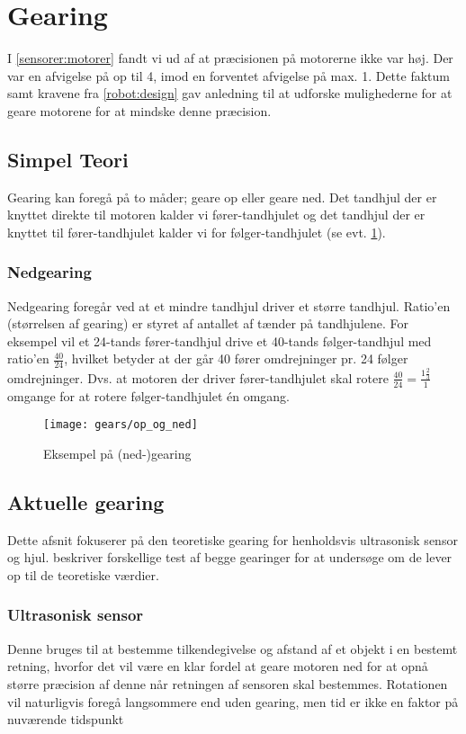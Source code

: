 \section{Gearing}\label{robot:gearing}
I \cref{sensorer:motorer} fandt vi ud af at præcisionen på motorerne ikke var høj.
Der var en afvigelse på op til 4\dg, imod en forventet afvigelse på max. 1\dg.
Dette faktum samt kravene fra \cref{robot:design} gav anledning til at udforske mulighederne for at geare motorene for at mindske denne præcision.

\subsection{Simpel Teori}\label{gearing:simpel_teori}
Gearing kan foregå på to måder; geare op eller geare ned.
Det tandhjul der er knyttet direkte til motoren kalder vi fører-tandhjulet og det tandhjul der er knyttet til fører-tandhjulet kalder vi for følger-tandhjulet (se evt. \cref{gearing:nedgearing}).

\subsubsection{Nedgearing}
Nedgearing foregår ved at et mindre tandhjul driver et større tandhjul.
Ratio'en (størrelsen af gearing) er styret af antallet af tænder på tandhjulene.
For eksempel vil et 24-tands fører-tandhjul drive et 40-tands følger-tandhjul med ratio'en $\frac{40}{24}$, hvilket betyder at der går 40 fører omdrejninger pr. 24 følger omdrejninger. Dvs. at motoren der driver fører-tandhjulet skal rotere $\frac{40}{24} = \frac{1 \frac{2}{3}}{1}$ omgange for at rotere følger-tandhjulet én omgang.

\begin{figure}[h]
\centering
\texttt{[image: gears/op\_og\_ned]}
\caption{Eksempel på (ned-)gearing}
\label{gearing:nedgearing}
\end{figure}

\subsection{Aktuelle gearing}
Dette afsnit fokuserer på den teoretiske gearing for henholdsvis ultrasonisk sensor og hjul.
 beskriver forskellige test af begge gearinger for at undersøge om de lever op til de teoretiske værdier.


\subsubsection{Ultrasonisk sensor}
Denne bruges til at bestemme tilkendegivelse og afstand af et objekt i en bestemt retning, hvorfor det vil være en klar fordel at geare motoren ned for at opnå større præcision af denne når retningen af sensoren skal bestemmes.
Rotationen vil naturligvis foregå langsommere end uden gearing, men tid er ikke en faktor på nuværende tidspunkt

